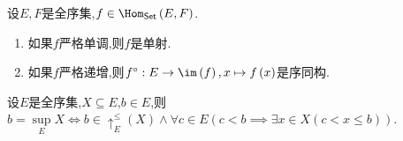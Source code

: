 \begin{proposition}{}{}
	设$E,F$是全序集,$f\in\Hom_{\mathsf{Set}}\left(E,F\right)$.
	\begin{enumerate}
		\item 如果$f$严格单调,则$f$是单射.
		\item 如果$f$严格递增,则$f^{\circ}:E\to\im\left(f\right),x\mapsto f\left(x\right)$是序同构.
	\end{enumerate}
\end{proposition}

\begin{proposition}{}{}
	设$E$是全序集,$X\subseteq E$,$b\in E$,则$b=\sup\limits_{E}X\iff b\in\uparrow_{E}^{\leq}\left(X\right)\wedge\forall c\in E\left(c<b\implies\exists x\in X\left(c<x\leq b\right)\right)$.
\end{proposition}














































